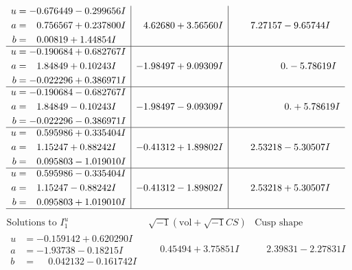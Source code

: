 \documentclass[1p]{elsarticle_modified}
\theoremstyle{definition}
\newcommand{\I}{\sqrt{-1}}
\begin{document}
$$\begin{array}{c|c|c}
\begin{aligned}
u &= -0.676449 - 0.299656 I \\
a &= \phantom{-}0.756567 + 0.237800 I \\
b &= \phantom{-}0.00819 + 1.44854 I\end{aligned}
 & \phantom{-}4.62680 + 3.56560 I & \phantom{-}7.27157 - 9.65744 I \\ \hline\begin{aligned}
u &= -0.190684 + 0.682767 I \\
a &= \phantom{-}1.84849 + 0.10243 I \\
b &= -0.022296 + 0.386971 I\end{aligned}
 & -1.98497 + 9.09309 I & \phantom{-0.000000 } 0. - 5.78619 I \\ \hline\begin{aligned}
u &= -0.190684 - 0.682767 I \\
a &= \phantom{-}1.84849 - 0.10243 I \\
b &= -0.022296 - 0.386971 I\end{aligned}
 & -1.98497 - 9.09309 I & \phantom{-0.000000 -}0. + 5.78619 I \\ \hline\begin{aligned}
u &= \phantom{-}0.595986 + 0.335404 I \\
a &= \phantom{-}1.15247 + 0.88242 I \\
b &= \phantom{-}0.095803 - 1.019010 I\end{aligned}
 & -0.41312 + 1.89802 I & \phantom{-}2.53218 - 5.30507 I \\ \hline\begin{aligned}
u &= \phantom{-}0.595986 - 0.335404 I \\
a &= \phantom{-}1.15247 - 0.88242 I \\
b &= \phantom{-}0.095803 + 1.019010 I\end{aligned}
 & -0.41312 - 1.89802 I & \phantom{-}2.53218 + 5.30507 I\\
 \hline 
 \end{array}$$\newpage$$\begin{array}{c|c|c}  
\text{Solutions to }I^u_{1}& \I (\text{vol} + \sqrt{-1}CS) & \text{Cusp shape}\\
 \hline 
\begin{aligned}
u &= -0.159142 + 0.620290 I \\
a &= -1.93738 - 0.18215 I \\
b &= \phantom{-}0.042132 - 0.161742 I\end{aligned}
 & \phantom{-}0.45494 + 3.75851 I & \phantom{-}2.39831 - 2.27831 I \\ \hline\begin{aligned}

\end{aligned}
\end{array}$$
\end{document}

